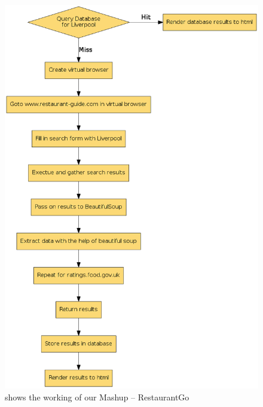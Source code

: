 \begin{figure}[!htb]
  \centering
  \caption[Flowchart showing the working of  RestaurantGo]
  {shows the working of our Mashup -- RestaurantGo}
  \vspace{0.8cm}
  \includegraphics[width=16cm]{fig/flow_chart.png}
\end{figure}

